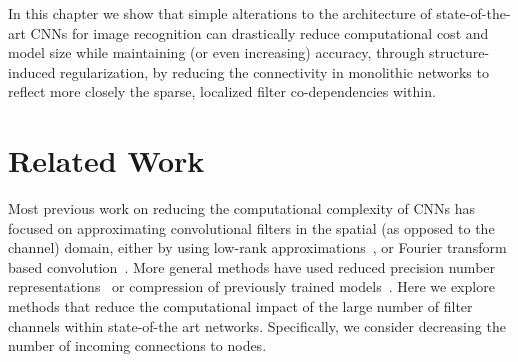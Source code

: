 \documentclass[thesis]{subfiles}
\begin{document}
	
	
	In this chapter we show that simple alterations to the architecture of state-of-the-art CNNs for image recognition can drastically reduce computational cost and model size while maintaining (or even increasing) accuracy, through structure-induced regularization, by reducing the connectivity in monolithic networks to reflect more closely the sparse, localized filter co-dependencies within.
	
	\section{Related Work}
	\label{previouswork}
	Most previous work on reducing the computational complexity of CNNs has focused on approximating convolutional filters in the spatial (as opposed to the channel) domain, either by using low-rank approximations~\citep{mamalet2012simplifying,journals/corr/JaderbergVZ14, journals/pami/SironiTRLF15, journals/corr/LebedevGROL14, Ioannou2016}, or Fourier transform based convolution~\cite{mathieu2013fast, rippel2015spectral}. More general methods have used reduced precision number representations~\cite{1502.02551v1} or compression of previously trained models~\cite{Chen2015,Kim2016}. Here we explore methods that reduce the computational impact of the large number of filter channels within state-of-the art networks. Specifically, we consider decreasing the number of incoming connections to nodes.
	
\end{document}
